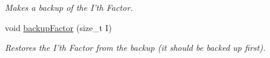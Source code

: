 \begin{CompactItemize}
\begin{CompactList}\small\item\em Makes a backup of the I'th Factor. \item\end{CompactList}\item 
\hypertarget{classdai_1_1FactorGraph_e2fe32e831db3e649e6ddd66762fea7c}{
void \hyperlink{classdai_1_1FactorGraph_e2fe32e831db3e649e6ddd66762fea7c}{backupFactor} (size\_\-t I)}
\label{classdai_1_1FactorGraph_e2fe32e831db3e649e6ddd66762fea7c}

\begin{CompactList}\small\item\em Restores the I'th Factor from the backup (it should be backed up first). \item\end{CompactList}\end{CompactItemize}
